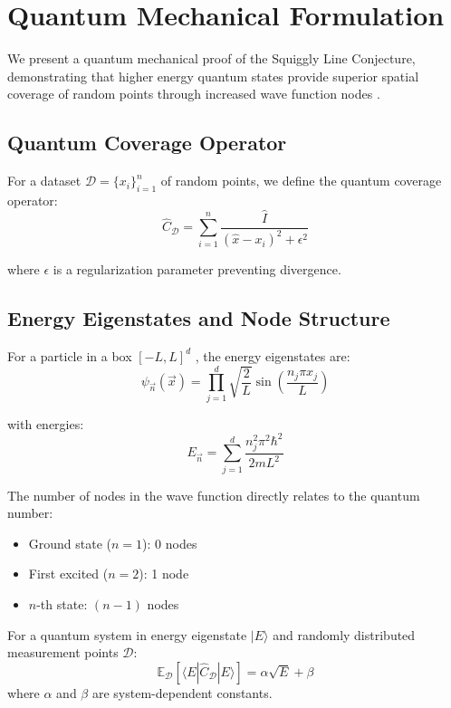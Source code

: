 \section{Quantum Mechanical Formulation}
\label{sec:quantum_theory}

We present a quantum mechanical proof of the Squiggly Line Conjecture, demonstrating that higher energy quantum states provide superior spatial coverage of random points through increased wave function nodes \cite{shankar2012principles}.

\subsection{Quantum Coverage Operator}

For a dataset $\mathcal{D} = \{x_i\}_{i=1}^n$ of random points, we define the quantum coverage operator:
$$\hat{C}_\mathcal{D} = \sum_{i=1}^n \frac{\hat{I}}{(\hat{x} - x_i)^2 + \epsilon^2}$$

where $\epsilon$ is a regularization parameter preventing divergence.

\subsection{Energy Eigenstates and Node Structure}

For a particle in a box $[-L, L]^d$ \cite{sakurai2017modern}, the energy eigenstates are:
$$\psi_{\vec{n}}(\vec{x}) = \prod_{j=1}^d \sqrt{\frac{2}{L}} \sin\left(\frac{n_j \pi x_j}{L}\right)$$

with energies:
$$E_{\vec{n}} = \sum_{j=1}^d \frac{n_j^2 \pi^2 \hbar^2}{2mL^2}$$

The number of nodes in the wave function directly relates to the quantum number:
\begin{itemize}
    \item Ground state ($n=1$): 0 nodes
    \item First excited ($n=2$): 1 node  
    \item $n$-th state: $(n-1)$ nodes
\end{itemize}

\begin{theorem}
For a quantum system in energy eigenstate $|E\rangle$ and randomly distributed measurement points $\mathcal{D}$:
$$\mathbb{E}_\mathcal{D}[\langle E | \hat{C}_\mathcal{D} | E \rangle] = \alpha \sqrt{E} + \beta$$
where $\alpha$ and $\beta$ are system-dependent constants.
\end{theorem}

